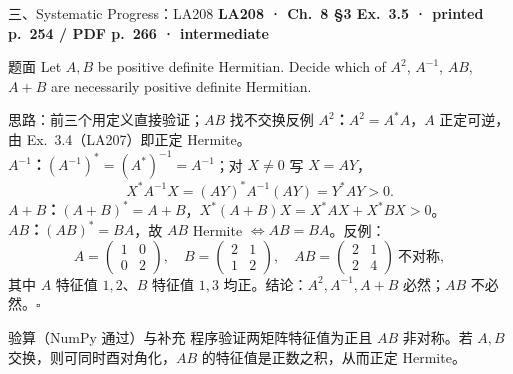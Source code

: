 \documentclass[aspectratio=169,10pt,fontset=none]{ctexbeamer}
\newcommand{\ex}[1]{\textcolor{accent}{\footnotesize\bfseries #1}}
\begin{document}
\begin{frame}[t]{三、Systematic Progress：LA208}
  \leavevmode\ex{LA208 · Ch.~8 §3 Ex.~3.5 · printed p.~254 / PDF p.~266 · intermediate}
  \begin{block}{\footnotesize 题面}
    \scriptsize Let $A,B$ be positive definite Hermitian. Decide which of $A^2$, $A^{-1}$, $AB$, $A+B$ are necessarily positive definite Hermitian.
  \end{block}
  \begin{exampleblock}{\footnotesize 思路：前三个用定义直接验证；$AB$ 找不交换反例}
    \scriptsize
    \textbf{$A^2$：}$A^2=A^*A$，$A$ 正定可逆，由 Ex.~3.4（LA207）即正定 Hermite。\\
    \textbf{$A^{-1}$：}$(A^{-1})^*=(A^*)^{-1}=A^{-1}$；对 $X\ne0$ 写 $X=AY$，
    $$X^*A^{-1}X=(AY)^*A^{-1}(AY)=Y^*AY>0.$$
    \textbf{$A+B$：}$(A+B)^*=A+B$，$X^*(A+B)X=X^*AX+X^*BX>0$。\\
    \textbf{$AB$：}$(AB)^*=BA$，故 $AB$ Hermite $\Leftrightarrow AB=BA$。反例：
    $$A=\begin{pmatrix}1&0\\0&2\end{pmatrix},\quad B=\begin{pmatrix}2&1\\1&2\end{pmatrix},\quad AB=\begin{pmatrix}2&1\\2&4\end{pmatrix}\ \text{不对称},$$
    其中 $A$ 特征值 $1,2$、$B$ 特征值 $1,3$ 均正。结论：$A^2,A^{-1},A+B$ 必然；$AB$ 不必然。$\square$
  \end{exampleblock}
  \begin{block}{\footnotesize 验算（NumPy 通过）与补充}
    \scriptsize 程序验证两矩阵特征值为正且 $AB$ 非对称。若 $A,B$ 交换，则可同时酉对角化，$AB$ 的特征值是正数之积，从而正定 Hermite。
  \end{block}
\end{frame}
\end{document}
